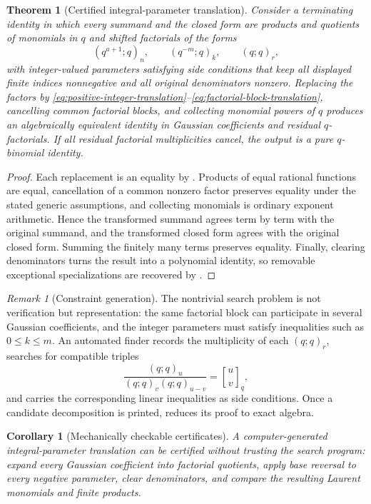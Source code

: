 \documentclass[11pt,oneside,openany]{book}
\newtheorem{theorem}{Theorem}[chapter]
\newtheorem{corollary}[corollary]{Corollary}
\theoremstyle{definition}
\theoremstyle{remark}
\newtheorem{remark}[remark]{Remark}
\newcommand{\Qbinom}[3]{\genfrac{[}{]}{0pt}{}{#1}{#2}_{#3}}
\begin{document}
\begin{theorem}[Certified integral-parameter translation]\label{thm:certified-integral-translation}
Consider a terminating identity in which every summand and the closed form are products and quotients of monomials in $q$ and shifted factorials of the forms
\[
 (q^{a+1};q)_n,
 \qquad
 (q^{-m};q)_k,
 \qquad
 (q;q)_r,
\]
with integer-valued parameters satisfying side conditions that keep all displayed finite indices nonnegative and all original denominators nonzero.  Replacing the factors by \eqref{eq:positive-integer-translation}--\eqref{eq:factorial-block-translation}, cancelling common factorial blocks, and collecting monomial powers of $q$ produces an algebraically equivalent identity in Gaussian coefficients and residual $q$-factorials.  If all residual factorial multiplicities cancel, the output is a pure $q$-binomial identity.
\end{theorem}

\begin{proof}
Each replacement is an equality by .  Products of equal rational functions are equal, cancellation of a common nonzero factor preserves equality under the stated generic assumptions, and collecting monomials is ordinary exponent arithmetic.  Hence the transformed summand agrees term by term with the original summand, and the transformed closed form agrees with the original closed form.  Summing the finitely many terms preserves equality.  Finally, clearing denominators turns the result into a polynomial identity, so removable exceptional specializations are recovered by .
\end{proof}

\begin{remark}[Constraint generation]
The nontrivial search problem is not verification but representation: the same factorial block can participate in several Gaussian coefficients, and the integer parameters must satisfy inequalities such as $0\le k\le m$.  An automated finder records the multiplicity of each $(q;q)_r$, searches for compatible triples
\[
 \frac{(q;q)_u}{(q;q)_v(q;q)_{u-v}}
 =\Qbinom uvq,
\]
and carries the corresponding linear inequalities as side conditions.  Once a candidate decomposition is printed,  reduces its proof to exact algebra.
\end{remark}

\begin{corollary}[Mechanically checkable certificates]\label{cor:identity-finder-certificate}
A computer-generated integral-parameter translation can be certified without trusting the search program: expand every Gaussian coefficient into factorial quotients, apply base reversal to every negative parameter, clear denominators, and compare the resulting Laurent monomials and finite products.
\end{corollary}
\end{document}
